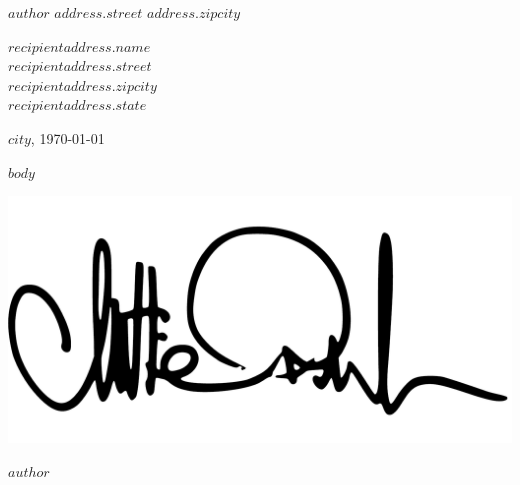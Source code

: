 \documentclass[$fontsize$, a4paper]{article}
\begin{document}
\small
\textsc{$author$} \textbullet{} \textsc{$address.street$} \textbullet{} \textsc{$address.zipcity$}

\vspace{1em}

\normalsize \sffamily
$recipientaddress.name$\\
$recipientaddress.street$\\
$recipientaddress.zipcity$\\
$recipientaddress.state$

\vspace{3em}

\rmfamily
\begin{flushright}
$city$, \today
\end{flushright}

\vspace{1em}

$body$

\begin{FlushRight}
  \includegraphics[height=5.5\baselineskip]{includes/signature.pdf} \par
  $author$
\end{FlushRight}
\end{document}
